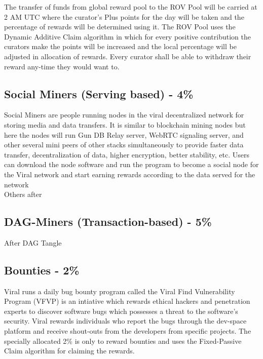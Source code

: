 \documentclass[conference]{IEEEtran}
\begin{document}
The transfer of funds from global reward pool to the ROV Pool will be carried at 2 AM UTC where the curator's Plus points for the day will be taken and the percentage of rewards will be determined using it. The ROV Pool uses the  Dynamic Additive Claim algorithm in which for every positive contribution the curators make the points will be increased and the local percentage will be adjusted in allocation of rewards. Every curator shall be able to withdraw their reward any-time they would want to.\\

\subsection{\textbf{Social Miners (Serving based) - 4\%}}

Social Miners are people running nodes in the viral decentralized network for storing media and data transfers. It is similar to blockchain mining nodes but here the nodes will run Gun DB Relay server, WebRTC signaling server, and other several mini peers of other stacks simultaneously to provide faster data transfer, decentralization of data, higher encryption, better stability, etc. Users can download the node software and run the program to become a social node for the Viral network and start earning rewards according to the data served for the network\\

Others after\\

\subsection{\textbf{DAG-Miners (Transaction-based) - 5\%}}

After DAG Tangle\\

\subsection{\textbf{Bounties - 2\%}}

Viral runs a daily bug bounty program called the Viral Find Vulnerability Program (VFVP) is an intiative which rewards ethical hackers and penetration experts to discover software bugs which possesses a threat to the software's security. Viral rewards individuals who report the bugs through the dev-space platform and receive shout-outs from the developers from specific projects. The specially allocated 2\% is only to reward bounties and uses the Fixed-Passive Claim algorithm for claiming the rewards. \\
\end{document}
